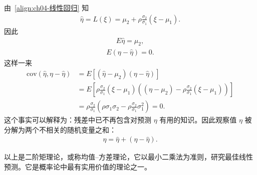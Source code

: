 \documentclass[../../main.tex]{subfiles}
\begin{document}
由~\eqref{align:ch04-线性回归} 知
\begin{align}
\hat{\eta}=L(\xi)=\mu_2+\rho\frac{\sigma_2}{\sigma_1}(\xi-\mu_1).\label{align:ch04-预测值}
\end{align}
因此
\begin{align}
E\hat{\eta}=\mu_2,\label{align:ch04-预测值期望}
\end{align}
\begin{align}
E(\eta-\hat{\eta})=0.\label{align:ch04-残差期望}
\end{align}
这样一来
\begin{align*}
\mathrm{cov}(\hat{\eta},\eta-\hat{\eta})
&=E[(\hat{\eta}-\mu_2)(\eta-\hat{\eta})]\\
&=E\left[\rho\frac{\sigma_2}{\sigma_1}(\xi-\mu_1)\left((\eta-\mu_2)-\rho\frac{\sigma_2}{\sigma_1}(\xi-\mu_1)\right)\right]\\
&=\rho\frac{\sigma_2}{\sigma_1}\left(\rho\sigma_1\sigma_2-\rho\frac{\sigma_2}{\sigma_1}\sigma_1^2\right)=0.
\end{align*}
这个事实可以解释为：残差中已不再包含对预测 $\eta$ 有用的知识。因此观察值 $\eta$ 被分解为两个不相关的随机变量之和：
\begin{align}
\eta=\hat{\eta}+(\eta-\hat{\eta}).\label{align:ch04-方差分解}
\end{align}

以上是二阶矩理论，或称均值--方差理论，它以最小二乘法为准则，研究最佳线性预测。它是概率论中最有实用价值的理论之一。
\end{document}
